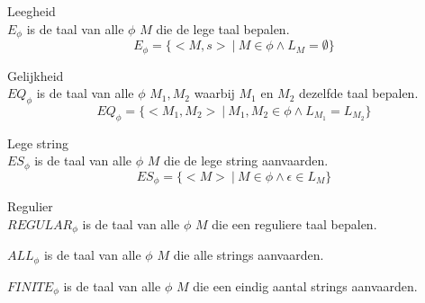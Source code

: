 \documentclass[main.tex]{subfiles}
\begin{document}
\begin{de}
  Leegheid\\
  $E_{\phi}$ is de taal van alle $\phi$ $M$ die de lege taal bepalen.
  \[ E_{\phi} = \{ <M,s>\ |\ M \in \phi \wedge L_{M} = \emptyset \} \]
\end{de}

\begin{de}
  Gelijkheid\\
  $EQ_{\phi}$ is de taal van alle $\phi$ $M_{1},M_{2}$ waarbij $M_{1}$ en $M_{2}$ dezelfde taal bepalen.
  \[ EQ_{\phi} = \{ <M_{1},M_{2}> \ |\ M_{1},M_{2} \in \phi \wedge L_{M_{1}} = L_{M_{2}} \} \]
\end{de}

\begin{de}
  Lege string\\
  $ES_{\phi}$ is de taal van alle $\phi$ $M$ die de lege string aanvaarden.
  \[ ES_{\phi} = \{ <M> \ |\ M\in \phi \wedge \epsilon \in L_{M}\} \]
\end{de}

\begin{de}
  Regulier\\
  $REGULAR_{\phi}$ is de taal van alle $\phi$ $M$ die een reguliere taal bepalen.
\end{de}

\begin{de}
  $ALL_{\phi}$ is de taal van alle $\phi$ $M$ die alle strings aanvaarden.
\end{de}

\begin{de}
   $FINITE_{\phi}$ is de taal van alle $\phi$ $M$ die een eindig aantal strings aanvaarden.
\end{de}
\end{document}

